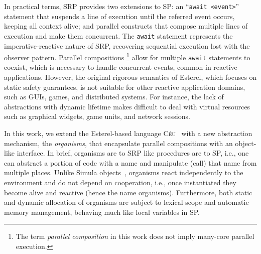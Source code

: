 \documentclass{acm_proc_article-sp}
\newcommand{\CEU}{\textsc{C\'{e}u}\xspace}
\newcommand{\code}[1] {{\small{\texttt{#1}}}}
\newcommand{\1}{\;}
\newcommand{\2}{\;\;}
\newcommand{\3}{\;\;\;}
\newcommand{\5}{\;\;\;\;\;}
\begin{document}
In practical terms, SRP provides two extensions to SP:
an ``\code{await <event>}'' statement that suspends a line of execution until 
the referred event occurs, keeping all context alive;
and parallel constructs that compose multiple lines of execution and make them 
concurrent.
%
The \code{await} statement represents the imperative-reactive nature of SRP, 
recovering sequential execution lost with the observer pattern.
Parallel compositions%
\footnote{
The term \emph{parallel composition} in this work does not imply many-core 
parallel execution.
}
allow for multiple \code{await} statements to coexist, which is necessary to 
handle concurrent events, common in reactive applications.
%
However, the original rigorous semantics of Esterel, which focuses on static 
safety guarantees, is not suitable for other reactive application domains, such 
as GUIs, games, and distributed systems.
%
For instance, the lack of abstractions with dynamic lifetime makes difficult to 
deal with virtual resources such as graphical widgets, game units, and network 
sessions.

In this work, we extend the Esterel-based language \CEU~\cite{ceu.sensys13} 
with a new abstraction mechanism, the \emph{organisms}, that encapsulate 
parallel compositions with an object-like interface.
%
In brief, organisms are to SRP like procedures are to SP, i.e., one can 
abstract a portion of code with a name and manipulate (call) that name from 
multiple places.
%
Unlike Simula objects~\cite{simula}, organisms react independently to the 
environment and do not depend on cooperation, i.e., once instantiated they 
become alive and reactive (hence the name organisms).
%
Furthermore, both static and dynamic allocation of organisms are subject to 
lexical scope and automatic memory management, behaving much like local 
variables in SP.

\end{document}
